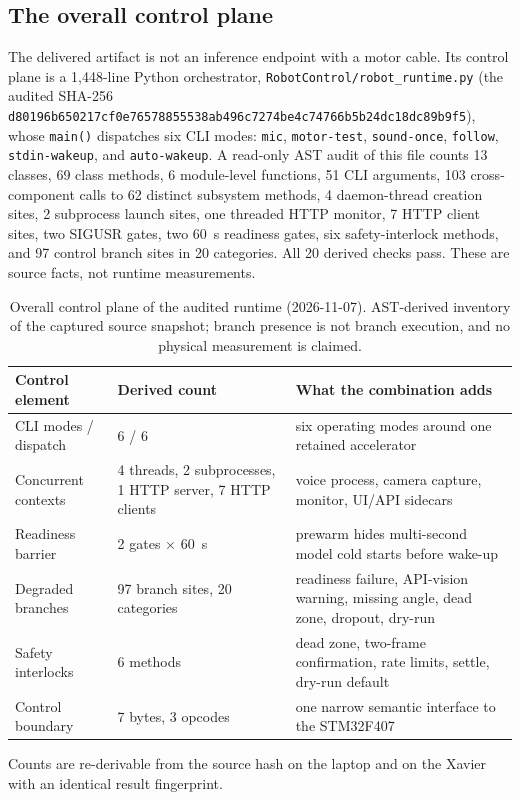 \documentclass[conference]{IEEEtran}
\newcommand{\code}[1]{\texttt{#1}}
\begin{document}
\subsection{The overall control plane}
\label{sec:controlplane}
The delivered artifact is not an inference endpoint with a motor cable. Its control plane is a 1,448-line Python orchestrator, \code{RobotControl/robot\_runtime.py} (the audited SHA-256 \code{d80196b650217cf0e76578855538ab496c}\allowbreak\code{7274be4c74766b5b24dc18dc89b9f5}), whose \code{main()} dispatches six CLI modes: \code{mic}, \code{motor-test}, \code{sound-once}, \code{follow}, \code{stdin-wakeup}, and \code{auto-wakeup}. A read-only AST audit of this file counts 13 classes, 69 class methods, 6 module-level functions, 51 CLI arguments, 103 cross-component calls to 62 distinct subsystem methods, 4 daemon-thread creation sites, 2 subprocess launch sites, one threaded HTTP monitor, 7 HTTP client sites, two SIGUSR gates, two 60~s readiness gates, six safety-interlock methods, and 97 control branch sites in 20 categories. All 20 derived checks pass. These are source facts, not runtime measurements.

\begin{table}[t]
\centering
\caption{Overall control plane of the audited runtime (2026-11-07). AST-derived inventory of the captured source snapshot; branch presence is not branch execution, and no physical measurement is claimed.}
\label{tab:control}
\footnotesize
\begin{tabularx}{\columnwidth}{@{}p{27mm}p{24mm}Y@{}}
\toprule
Control element & Derived count & What the combination adds\\
\midrule
CLI modes / dispatch & 6 / 6 & six operating modes around one retained accelerator\\
Concurrent contexts & 4 threads, 2 subprocesses, 1 HTTP server, 7 HTTP clients & voice process, camera capture, monitor, UI/API sidecars\\
Readiness barrier & 2 gates $\times$ 60~s & prewarm hides multi-second model cold starts before wake-up\\
Degraded branches & 97 branch sites, 20 categories & readiness failure, API-vision warning, missing angle, dead zone, dropout, dry-run\\
Safety interlocks & 6 methods & dead zone, two-frame confirmation, rate limits, settle, dry-run default\\
Control boundary & 7 bytes, 3 opcodes & one narrow semantic interface to the STM32F407\\
\bottomrule
\end{tabularx}
\vspace{2pt}
\begin{flushleft}
\footnotesize Counts are re-derivable from the source hash on the laptop and on the Xavier with an identical result fingerprint.
\end{flushleft}
\end{table}
\end{document}
